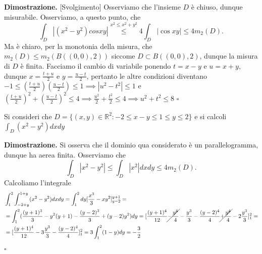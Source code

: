 %
\noindent \textbf{Dimostrazione. } [Svolgimento]
	Osserviamo che l'insieme $D$ è chiuso, dunque misurabile. Osserviamo, a questo punto, che
	$$
		\int_D |(x^2 - y^2)cos{xy}| \stackrel{x^2 \leq x^2 + y^2}{\leq} 4 \int_D |\cos{xy}| \leq 4 m_2(D).
	$$
	Ma è chiaro, per la monotonia della misura, che $m_2(D) \leq m_2(B((0, 0), 2))$ siccome $D \subset B((0, 0), 2)$, dunque la misura di $D$ è finita.
	Facciamo il cambio di variabile ponendo $t = x - y$ e $u = x+y$, dunque $x = \frac{t+u}{2}$ e $y = \frac{u-t}{2}$, pertanto le altre condizioni diventano
	$
	-1 \leq (\frac{t+u}{2})(\frac{u-t}{2}) \leq 1 \implies |u^2 - t^2| \leq 1
	$
	e $(\frac{t+u}{2})^2 + (\frac{u-t}{2})^2 \leq 4 \implies \frac{u^2}{2} + \frac{t^2}{2} \leq 4 \implies u^2 + t^2 \leq 8$
\hfill $\square$
%
\vspace{0.5cm}
\begin{exercise}
	Si consideri che $D = \{(x, y) \in \mathbb{R}^2 : -2 \leq x - y \leq 1 \leq y \leq 2 \}$ e si calcoli $\int_D (x^2 - y^2)dxdy$
\end{exercise}
%
\noindent \textbf{Dimostrazione. }
	Si osserva che il dominio qua considerato è un parallelogramma, dunque ha aerea finita. Osserviamo che
	$$
		\int_D |x^2 - y^2| \leq \int_D |x^2|dxdy \leq 4 m_2(D).
	$$
	Calcoliamo l'integrale
	\[\begin{aligned}
		&\int_1^2 \int_{-2 + y}^{1 + y} (x^2 - y^2) dxdy = \int_1^2 dy [\frac{x^3}{3} - xy^2]^{y+1}_{y-2} = \\
		&=\int_1^2 (\frac{(y+1)^3}{3} - y^2(y+1) - \frac{(y-2)^3}{3} + (y-2)y^2)dy = [\frac{(y+1)^4}{12} \cancel{- \frac{y^4}{4}} - \frac{y^3}{3} - \frac{(y-2)^4}{4} \cancel{+ \frac{y^4}{4}} - 2\frac{y^3}{3}]^2_1 = \\
		&=[\frac{(y+1)^4}{12} - 3\frac{y^3}{3} - \frac{(y-2)^4}{4}]^2_1 = 3 \int_1^2 (1-y)dy = - \frac{3}{2}
	\end{aligned}\]
\hfill $\square$